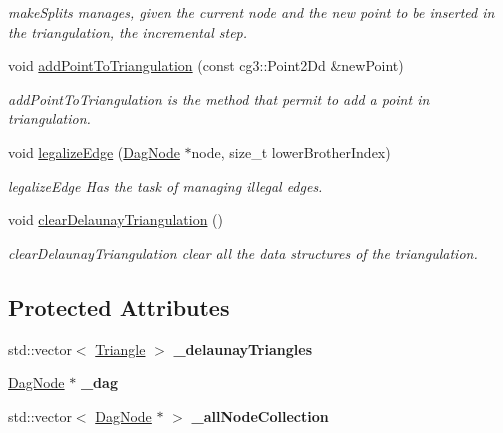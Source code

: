 \begin{DoxyCompactItemize}
\begin{DoxyCompactList}\small\item\em make\+Splits manages, given the current node and the new point to be inserted in the triangulation, the incremental step. \end{DoxyCompactList}\item 
void \hyperlink{classDelaunayTriangulationAlgorithm_ab1844da431a8e6bdc1cd98153d0502db}{add\+Point\+To\+Triangulation} (const cg3\+::\+Point2\+Dd \&new\+Point)
\begin{DoxyCompactList}\small\item\em add\+Point\+To\+Triangulation is the method that permit to add a point in triangulation. \end{DoxyCompactList}\item 
void \hyperlink{classDelaunayTriangulationAlgorithm_a350d489829dfbe0e141a967706bf6c53}{legalize\+Edge} (\hyperlink{classDagNode}{Dag\+Node} $\ast$node, size\+\_\+t lower\+Brother\+Index)
\begin{DoxyCompactList}\small\item\em legalize\+Edge Has the task of managing illegal edges. \end{DoxyCompactList}\item 
\mbox{\label{classDelaunayTriangulationAlgorithm_a5a6200d340145da69bc8654dc59d1723}} 
void \hyperlink{classDelaunayTriangulationAlgorithm_a5a6200d340145da69bc8654dc59d1723}{clear\+Delaunay\+Triangulation} ()
\begin{DoxyCompactList}\small\item\em clear\+Delaunay\+Triangulation clear all the data structures of the triangulation. \end{DoxyCompactList}\end{DoxyCompactItemize}
\subsection*{Protected Attributes}
\begin{DoxyCompactItemize}
\item 
\mbox{\label{classDelaunayTriangulationAlgorithm_a35352bc5faf12a1fba8895c88a291e51}} 
std\+::vector$<$ \hyperlink{classTriangle}{Triangle} $>$ {\bfseries \+\_\+delaunay\+Triangles}
\item 
\mbox{\label{classDelaunayTriangulationAlgorithm_a41e9bf649c65a019dd9d932537b24ae8}} 
\hyperlink{classDagNode}{Dag\+Node} $\ast$ {\bfseries \+\_\+dag}
\item 
\mbox{\label{classDelaunayTriangulationAlgorithm_a8cb41561f95d8eef189a89e991e032ba}} 
std\+::vector$<$ \hyperlink{classDagNode}{Dag\+Node} $\ast$ $>$ {\bfseries \+\_\+all\+Node\+Collection}
\end{DoxyCompactItemize}


